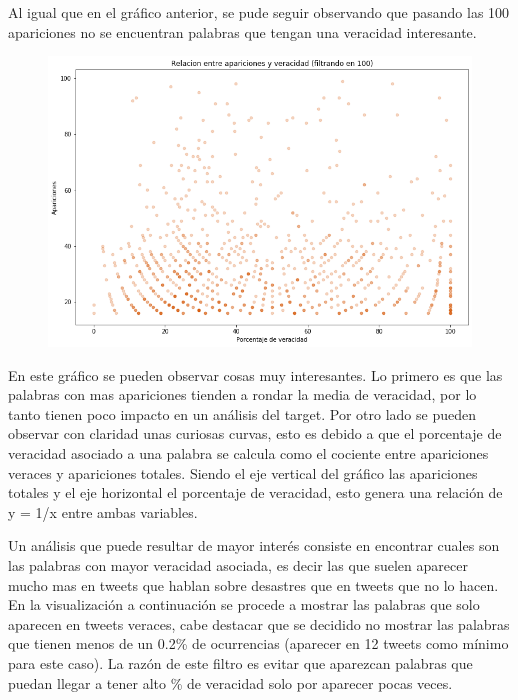 \documentclass[titlepage,a4paper]{article}
\begin{document}
    Al igual que en el gráfico anterior, se pude seguir observando que pasando las 100 apariciones no se encuentran palabras que tengan una veracidad interesante.
    
    \begin{figure}[H]
    \centering
    \includegraphics[width=1\textwidth]{graficos/Analisis Lexico Grafico/relacion_entre_aparicion_y_veracidad_filt_100.png}
    \caption{}
    \end{figure}
    
    En este gráfico se pueden observar cosas muy interesantes. Lo primero es que las palabras con mas apariciones tienden a rondar la media de veracidad, por lo tanto tienen poco impacto en un análisis del target.
    Por otro lado se pueden observar con claridad unas curiosas curvas, esto es debido a que el porcentaje de veracidad asociado a una palabra se calcula como el cociente entre apariciones veraces y apariciones totales. Siendo el eje vertical del gráfico las apariciones totales y el eje horizontal el porcentaje de veracidad, esto genera una relación de y = 1/x entre ambas variables.
    
    Un análisis que puede resultar de mayor interés consiste en encontrar cuales son las palabras con mayor veracidad asociada, es decir las que suelen aparecer mucho mas en tweets que hablan sobre desastres que en tweets que no lo hacen. En la visualización a continuación se procede a mostrar las palabras que solo aparecen en tweets veraces, cabe destacar que se decidido no mostrar las palabras que tienen menos de un 0.2\% de ocurrencias (aparecer en 12 tweets como mínimo para este caso). La razón de este filtro es evitar que aparezcan palabras que puedan llegar a tener alto \% de veracidad solo por aparecer pocas veces.
    
\end{document}
